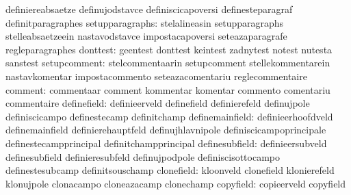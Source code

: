                                   definiereabsaetze                definujodstavce
                                  definiscicapoversi               definesteparagraf
                                  definitparagraphes
                 setupparagraphs: stelalineasin                    setupparagraphs
                                  stelleabsaetzeein                nastavodstavce
                                  impostacapoversi                 seteazaparagrafe
                                  regleparagraphes
                        donttest: geentest                         donttest
                                  keintest                         zadnytest
                                  notest                           nutesta
                                  sanstest
                    setupcomment: stelcommentaarin                 setupcomment
                                  stellekommentarein               nastavkomentar
                                  impostacommento                  seteazacomentariu
                                  reglecommentaire
                         comment: commentaar                       comment
                                  kommentar                        komentar
                                  commento                         comentariu
                                  commentaire
                     definefield: definieerveld                    definefield
                                  definierefeld                    definujpole
                                  definiscicampo                   definestecamp
                                  definitchamp
                 definemainfield: definieerhoofdveld               definemainfield
                                  definierehauptfeld               definujhlavnipole
                                  definiscicampoprincipale         definestecampprincipal
                                  definitchampprincipal
                  definesubfield: definieersubveld                 definesubfield
                                  definieresubfeld                 definujpodpole
                                  definiscisottocampo              definestesubcamp
                                  definitsouschamp
                      clonefield: kloonveld                        clonefield
                                  klonierefeld                     klonujpole
                                  clonacampo                       cloneazacamp
                                  clonechamp
                       copyfield: copieerveld                      copyfield
